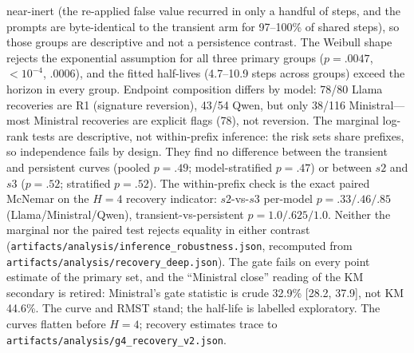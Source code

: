 \documentclass[a4paper,fleqn]{cas-sc}
\begin{document}
near-inert (the re-applied false value recurred in only a handful of steps, and the prompts are
byte-identical to the transient arm for 97--100\% of shared steps), so those groups are
descriptive and not a persistence contrast. The Weibull shape rejects the exponential assumption
for all three primary groups ($p=.0047$, $<10^{-4}$, $.0006$), and the fitted half-lives
(4.7--10.9 steps across groups) exceed the horizon in
every group. Endpoint composition differs by model: 78/80 Llama recoveries are R1 (signature
reversion), 43/54 Qwen, but only 38/116 Ministral---most Ministral recoveries are explicit flags
(78), not reversion. The marginal log-rank tests are descriptive, not within-prefix inference:
the risk sets share prefixes, so independence fails by design. They find no difference between
the transient and persistent curves (pooled $p=.49$; model-stratified $p=.47$) or between $s2$
and $s3$ ($p=.52$; stratified $p=.52$). The within-prefix check is the exact paired McNemar on
the $H=4$ recovery indicator: $s2$-vs-$s3$ per-model $p=.33/.46/.85$ (Llama/Ministral/Qwen),
transient-vs-persistent $p=1.0/.625/1.0$. Neither the marginal nor the paired test rejects
equality in either contrast
(\texttt{artifacts/analysis/inference\_robustness.json}, recomputed from
\texttt{artifacts/analysis/recovery\_deep.json}). The gate fails on every point estimate of the primary set, and the ``Ministral close'' reading of the KM secondary is retired: Ministral's gate statistic is crude 32.9\% [28.2, 37.9], not KM 44.6\%. The curve and RMST stand; the
half-life is labelled exploratory. The curves flatten before $H=4$; recovery estimates trace to
\texttt{artifacts/analysis/g4\_recovery\_v2.json}.
\end{document}
